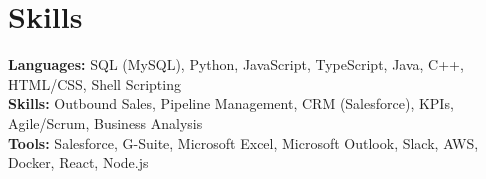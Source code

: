 \documentclass[11pt]{article}       %
\begin{document}
\vspace{-18.5pt}

\section*{Skills}
\textbf{Languages:} SQL (MySQL), Python, JavaScript, TypeScript, Java, C++, HTML/CSS, Shell Scripting\\
\textbf{Skills:} Outbound Sales, Pipeline Management, CRM (Salesforce), KPIs, Agile/Scrum, Business Analysis\\
\textbf{Tools:} Salesforce, G-Suite, Microsoft Excel, Microsoft Outlook, Slack, AWS, Docker, React, Node.js\\

\vspace{-6.5pt}
\end{document}
